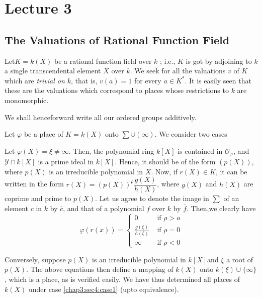 \chapter{Lecture 3}\label{chap3}

\setcounter{section}{3}
\section{The Valuations of Rational Function Field}\label{chap3:sec4}

Let\pageoriginale $K = k(X)$ be a rational function field over $k$ ; i.e., $K$ is
got by adjoining to $k$ a single transcendental element $X$ over
$k$. We seek for all the valuations $v$ of $K$ which are
\textit{trivial on $k$}, that is, $v(a)=1$ for every $a \in K^*$. It
is easily seen that these are the valuations which correspond to
places whose restrictions to $k$ are monomorphic. 

We shall henceforward write all our ordered groups additively.

Let $\varphi$ be a place of $K = k(X)$ onto $\sum \cup (\infty)$. We
consider two cases 
\begin{Case}\label{chap3:sec4:case1} %
  Let $\varphi (X) = \xi \neq \infty$. Then, the polynomial ring
  $k[X]$ is contained in $\mathscr{O}_{\varphi}$, and $\mathscr{Y} \cap
  k[X]$ is a prime ideal in $k [X]$. Hence, it should be of the form
  $(p(X))$, where $p(X)$ is an irreducible polynomial in $X$. Now, if
  $r(X) \in K$, it can be written in the form $r(X) = (p(X))^\rho
  \dfrac{g(X)}{h(X)}$, where $g(X)$ and $h(X)$ are coprime and prime
  to $p(X)$. Let us agree to denote the image in $\sum$ of an element
  $c$ in $k$ by $\bar{c}$, and that of a polynomial $f$ over $k$ by
  $\bar{f}$. Then,we clearly have  
  \begin{equation*}
    \varphi (r(x)) = 
    \begin{cases}
      0 & \text{ if  } \rho > o \\ 
      \frac{g(\xi)}{h(\xi)} & \text{ if } \rho = 0 \\ 
      \infty & \text{ if }\rho < 0 
    \end{cases}
  \end{equation*}
\end{Case}

Conversely, suppose $p(X)$ is an irreducible polynomial in $k[X]$\pageoriginale and
$\xi$ a root of $p(X)$. The above equations then define a mapping of
$k(X)$ onto $k(\xi) \cup \{ \infty\}$, which is a place, as is verified
easily. We have thus determined all places of $k(X)$ under case
\ref{chap3:sec4:case1} 
(upto equivalence). 

